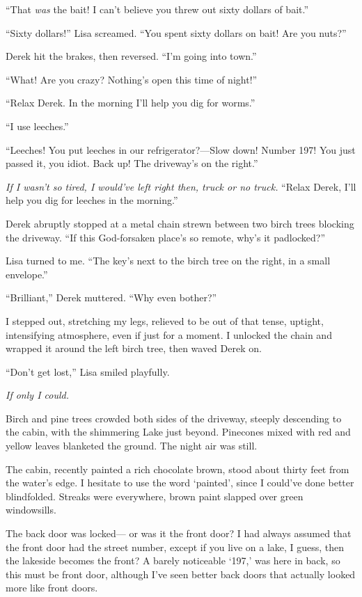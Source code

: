 ``That \emph{was} the bait! I can't believe you threw out sixty dollars
of bait.''

``Sixty dollars!'' Lisa screamed. ``You spent sixty dollars on bait! Are
you nuts?''

Derek hit the brakes, then reversed. ``I'm going into town.''

``What! Are you crazy? Nothing's open this time of night!''

``Relax Derek. In the morning I'll help you dig for worms.''

``I use leeches.''

``Leeches! You put leeches in our refrigerator?---Slow down! Number 197!
You just passed it, you idiot. Back up! The driveway's on the right.''

\emph{If I wasn't so tired, I would've left right then, truck or no
truck.} ``Relax Derek, I'll help you dig for leeches in the morning.''

Derek abruptly stopped at a metal chain strewn between two birch trees
blocking the driveway. ``If this God-forsaken place's so remote, why's
it padlocked?''

Lisa turned to me. ``The key's next to the birch tree on the right, in a
small envelope.''

``Brilliant,'' Derek muttered. ``Why even bother?''

I stepped out, stretching my legs, relieved to be out of that tense,
uptight, intensifying atmosphere, even if just for a moment. I unlocked
the chain and wrapped it around the left birch tree, then waved Derek
on.

``Don't get lost,'' Lisa smiled playfully.

\emph{If only I could.}

Birch and pine trees crowded both sides of the driveway, steeply
descending to the cabin, with the shimmering Lake just beyond. Pinecones
mixed with red and yellow leaves blanketed the ground. The night air was
still.

The cabin, recently painted a rich chocolate brown, stood about thirty
feet from the water's edge. I hesitate to use the word `painted', since
I could've done better blindfolded. Streaks were everywhere, brown paint
slapped over green windowsills.

The back door was locked--- or was it the front door? I had always
assumed that the front door had the street number, except if you live on
a lake, I guess, then the lakeside becomes the front? A barely
noticeable `197,' was here in back, so this must be front door, although
I've seen better back doors that actually looked more like front doors.

